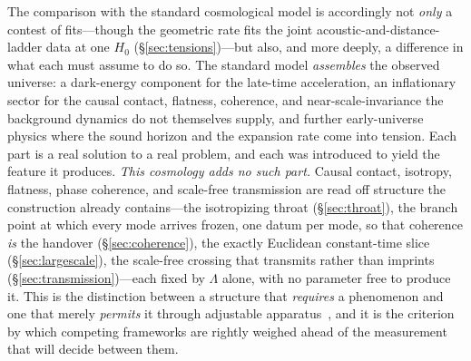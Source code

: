 \documentclass[11pt,a4paper]{article}
\theoremstyle{plain}
\theoremstyle{definition}
\theoremstyle{remark}
\begin{document}
The comparison with the standard cosmological model is accordingly not \emph{only} a contest of fits---though the geometric rate fits the joint acoustic-and-distance-ladder data at one $H_0$ (\S\ref{sec:tensions})---but also, and more deeply, a difference in what each must assume to do so. The standard model \emph{assembles} the observed universe: a dark-energy component for the late-time acceleration, an inflationary sector for the causal contact, flatness, coherence, and near-scale-invariance the background dynamics do not themselves supply, and further early-universe physics where the sound horizon and the expansion rate come into tension. Each part is a real solution to a real problem, and each was introduced to yield the feature it produces. \emph{This cosmology adds no such part.} Causal contact, isotropy, flatness, phase coherence, and scale-free transmission are read off structure the construction already contains---the isotropizing throat (\S\ref{sec:throat}), the branch point at which every mode arrives frozen, one datum per mode, so that coherence \emph{is} the handover (\S\ref{sec:coherence}), the exactly Euclidean constant-time slice (\S\ref{sec:largescale}), the scale-free crossing that transmits rather than imprints (\S\ref{sec:transmission})---each fixed by $\Lambda$ alone, with no parameter free to produce it. This is the distinction between a structure that \emph{requires} a phenomenon and one that merely \emph{permits} it through adjustable apparatus~\cite{JanzenShadowExistence,JanzenModernParallax}, and it is the criterion by which competing frameworks are rightly weighed ahead of the measurement that will decide between them.
\end{document}
